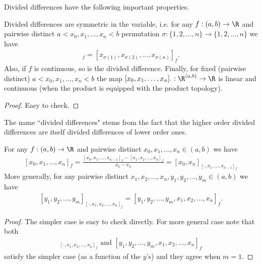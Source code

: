 Divided differences have the following important properties.

\begin{prop}
	Divided differences are symmetric in the variable, i.e. for any $f : (a, b) \to \R$ and pairwise distinct $a < x_{0}, x_{1}, \ldots, x_{n} < b$ permutation $\sigma : \{1, 2, \ldots, n\} \to \{1, 2, \ldots, n\}$ we have
	\begin{align*}
		[x_{1}, x_{2}, \ldots, x_{n}]_{f} = [x_{\sigma(1)}, x_{\sigma(2)}, \ldots, x_{\sigma(n)}]_{f}.
	\end{align*}
	Also, if $f$ is continuous, so is the divided difference.
	Finally, for fixed (pairwise distinct) $a < x_{0}, x_{1}, \ldots, x_{n} < b$ the map $[x_{0}, x_{1}, \ldots, x_{n}]_{\cdot} : \R^{(a, b)} \to \R$ is linear and continuous (when the product is equipped with the product topology).
\end{prop}
\begin{proof}
	Easy to check.
\end{proof}

The name ``divided differences" stems from the fact that the higher order divided differences are itself divided differences of lower order ones.

\begin{prop}\label{nesting_property}
	For any $f : (a, b) \to \R$ and pairwise distinct $x_{0}, x_{1}, \ldots, x_{n} \in (a, b)$ we have
	\begin{align}\label{divdif_rec}
		[x_{0}, x_{1}, \ldots, x_{n}]_{f} = \frac{[x_{0}, x_{1}, \ldots, x_{n - 1}]_{f} - [x_{1}, x_{2}, \ldots, x_{n}]_{f}}{x_{0} - x_{n}} = [x_{0}, x_{n}]_{[\cdot, x_{1}, \ldots, x_{n - 1}]_f}
	\end{align}
	More generally, for any pairwise distinct $x_{1}, x_{2}, \ldots, x_{n}, y_{1}, y_{2}, \ldots, y_{m} \in (a, b)$ we have
	\begin{align}\label{nesting_rule}
		[y_{1}, y_{2}, \ldots, y_{m}]_{[\cdot, x_{1}, x_{2}, \ldots, x_{n}]_{f}} = [y_{1}, y_{2}, \ldots, y_{m}, x_{1}, x_{2}, \ldots, x_{n}]_{f}.
	\end{align}
\end{prop}
\begin{proof}
	The simpler case is easy to check directly. For more general case note that both
	\begin{align*}
	[y_{1}, y_{2}, \ldots, y_{m}]_{[\cdot, x_{1}, x_{2}, \ldots, x_{n}]_{f}} \text{ and } [y_{1}, y_{2}, \ldots, y_{m}, x_{1}, x_{2}, \ldots, x_{n}]_{f}
	\end{align*}
	satisfy the simpler case (as a function of the $y$'s) and they agree when $m = 1$.
\end{proof}

